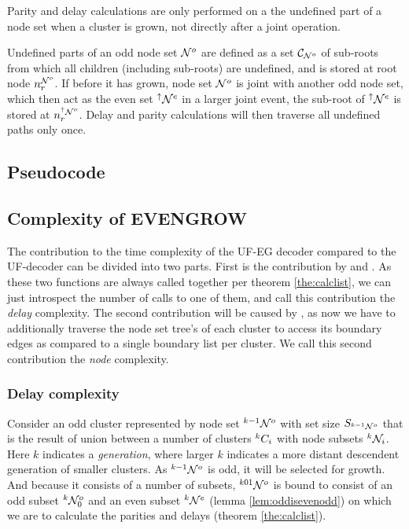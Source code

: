 \begin{lemma}\label{lem:delaywhengrown}
  Parity and delay calculations are only performed on a the undefined part of a node set when a cluster is grown, not directly after a joint operation.
\end{lemma}


\begin{theorem}\label{the:delayonce}
  Undefined parts of an odd node set $\mathcal{N}^o$ are defined as a set $\mathcal{C}_{\mathcal{N}^o}$ of sub-roots from which all children (including sub-roots) are undefined, and is stored at root node $n^{\mathcal{N}^o}_r$. If before it has grown, node set $\mathcal{N}^o$ is joint with another odd node set, which then act as the even set ${}^{\uparrow}\mathcal{N}^e$ in a larger joint event, the sub-root of ${}^{\uparrow}\mathcal{N}^e$ is stored at $n^{{}^{\uparrow}\mathcal{N}^o}_r$. Delay and parity calculations will then traverse all undefined paths only once. 
\end{theorem}


\subsection{Pseudocode}

\subsection{Complexity of EVENGROW}

The contribution to the time complexity of the UF-EG decoder compared to the UF-decoder can be divided into two parts. First is the contribution by  and . As these two functions are always called together per theorem \ref{the:calclist}, we can just introspect the number of calls to one of them, and call this contribution the \emph{delay} complexity. The second contribution will be caused by , as now we have to additionally traverse the node set tree's of each cluster to access its boundary edges as compared to a single boundary list per cluster. We call this second contribution the \emph{node} complexity.

\subsubsection{Delay complexity}

Consider an odd cluster represented by node set ${}^{k-1}\mathcal{N}^o$ with set size $S_{{}^{k-1}\mathcal{N}^o}$ that is the result of union between a number of clusters ${}^{k}C_i$ with node subsets ${}^{k}\mathcal{N}_i$. Here $k$ indicates a \emph{generation}, where larger $k$ indicates a more distant descendent generation of smaller clusters. As ${}^{k-1}\mathcal{N}^o$ is odd, it will be selected for growth. And because it consists of a number of subsets, ${}^{k01}\mathcal{N}^o$ is bound to consist of an odd subset ${}^{k}\mathcal{N}^o_0$ and an even subset ${}^{k}\mathcal{N}^e$ (lemma \ref{lem:oddisevenodd}) on which we are to calculate the parities and delays (theorem \ref{the:calclist}).

